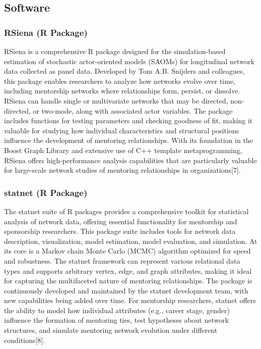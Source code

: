 \documentclass[
  letterpaper,
  DIV=11,
  numbers=noendperiod]{scrartcl}
\begin{document}
\subsection{Software}\label{software}

\subsubsection{RSiena (R Package)}\label{rsiena-r-package}

RSiena is a comprehensive R package designed for the simulation-based
estimation of stochastic actor-oriented models (SAOMs) for longitudinal
network data collected as panel data. Developed by Tom A.B. Snijders and
colleagues, this package enables researchers to analyze how networks
evolve over time, including mentorship networks where relationships
form, persist, or dissolve. RSiena can handle single or multivariate
networks that may be directed, non-directed, or two-mode, along with
associated actor variables. The package includes functions for testing
parameters and checking goodness of fit, making it valuable for studying
how individual characteristics and structural positions influence the
development of mentoring relationships. With its foundation in the Boost
Graph Library and extensive use of C++ template metaprogramming, RSiena
offers high-performance analysis capabilities that are particularly
valuable for large-scale network studies of mentoring relationships in
organizations{[}7{]}.

\subsubsection{statnet (R Package)}\label{statnet-r-package}

The statnet suite of R packages provides a comprehensive toolkit for
statistical analysis of network data, offering essential functionality
for mentorship and sponsorship researchers. This package suite includes
tools for network data description, visualization, model estimation,
model evaluation, and simulation. At its core is a Markov chain Monte
Carlo (MCMC) algorithm optimized for speed and robustness. The statnet
framework can represent various relational data types and supports
arbitrary vertex, edge, and graph attributes, making it ideal for
capturing the multifaceted nature of mentoring relationships. The
package is continuously developed and maintained by the statnet
development team, with new capabilities being added over time. For
mentorship researchers, statnet offers the ability to model how
individual attributes (e.g., career stage, gender) influence the
formation of mentoring ties, test hypotheses about network structures,
and simulate mentoring network evolution under different
conditions{[}8{]}.
\end{document}
